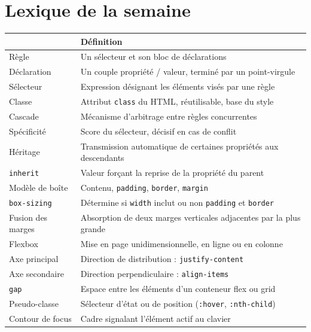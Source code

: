 \documentclass[a4paper,11pt]{article}
\newcommand{\hdr}[1]{\multicolumn{1}{l}{\color{white}\bfseries #1}}
\renewcommand{\arraystretch}{1.3}
\begin{document}
\section{Lexique de la semaine}

\begin{center}
\renewcommand{\arraystretch}{1.0}
\begin{tabularx}{\linewidth}{p{4cm}X}
  \toprule
  \rowcolor{uniNavy}
  \hdr{Terme} & \hdr{Définition} \\
  \midrule
  \rowcolor{uniPaper}
  Règle & Un sélecteur et son bloc de déclarations \\
  Déclaration & Un couple propriété / valeur, terminé par un point-virgule \\
  \rowcolor{uniPaper}
  Sélecteur & Expression désignant les éléments visés par une règle \\
  Classe & Attribut \texttt{class} du HTML, réutilisable, base du style \\
  \rowcolor{uniPaper}
  Cascade & Mécanisme d'arbitrage entre règles concurrentes \\
  Spécificité & Score du sélecteur, décisif en cas de conflit \\
  \rowcolor{uniPaper}
  Héritage & Transmission automatique de certaines propriétés aux descendants \\
  \texttt{inherit} & Valeur forçant la reprise de la propriété du parent \\
  \rowcolor{uniPaper}
  Modèle de boîte & Contenu, \texttt{padding}, \texttt{border}, \texttt{margin} \\
  \texttt{box-sizing} & Détermine si \texttt{width} inclut ou non \texttt{padding} et \texttt{border} \\
  \rowcolor{uniPaper}
  Fusion des marges & Absorption de deux marges verticales adjacentes par la plus grande \\
  Flexbox & Mise en page unidimensionnelle, en ligne ou en colonne \\
  \rowcolor{uniPaper}
  Axe principal & Direction de distribution : \texttt{justify-content} \\
  Axe secondaire & Direction perpendiculaire : \texttt{align-items} \\
  \rowcolor{uniPaper}
  \texttt{gap} & Espace entre les éléments d'un conteneur flex ou grid \\
  Pseudo-classe & Sélecteur d'état ou de position (\texttt{:hover}, \texttt{:nth-child}) \\
  \rowcolor{uniPaper}
  Contour de focus & Cadre signalant l'élément actif au clavier \\
  \bottomrule
\end{tabularx}
\end{center}
\end{document}
